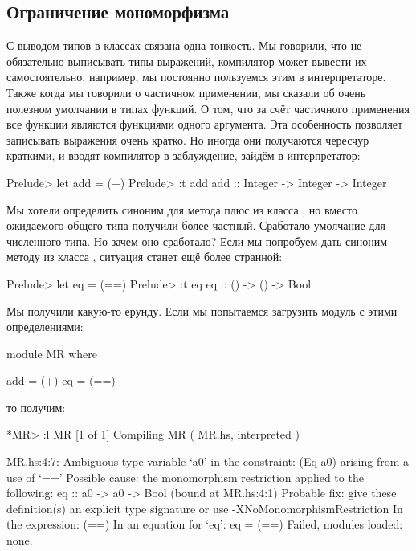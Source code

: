 \subsection{Ограничение мономорфизма}

С выводом типов в классах связана одна тонкость. 
Мы говорили, что не обязательно выписывать типы выражений,
компилятор может вывести их самостоятельно, например, 
мы постоянно пользуемся этим в интерпретаторе.
Также когда мы говорили о частичном применении,
мы сказали об очень полезном умолчании в типах функций.
О том, что за счёт частичного применения все функции 
являются функциями одного аргумента. Эта особенность
позволяет записывать выражения очень кратко. Но иногда
они получаются чересчур краткими, и вводят компилятор
в заблуждение, зайдём в интерпретатор:

\begin{code}
Prelude> let add = (+)
Prelude> :t add
add :: Integer -> Integer -> Integer
\end{code}

Мы хотели определить синоним для метода плюс из класса ,
но вместо ожидаемого общего типа получили более частный. 
Сработало умолчание для численного типа. Но зачем оно сработало?
Если мы попробуем дать синоним методу из класса ,
ситуация станет ещё более странной:

\begin{code}
Prelude> let eq = (==)
Prelude> :t eq
eq :: () -> () -> Bool
\end{code}

Мы получили какую-то ерунду. Если мы попытаемся загрузить 
модуль с этими определениями:

\begin{code}
module MR where

add = (+)
eq  = (==)
\end{code}

\noindent то получим:

\begin{code}
*MR> :l MR
[1 of 1] Compiling MR               ( MR.hs, interpreted )

MR.hs:4:7:
    Ambiguous type variable `a0' in the constraint:
      (Eq a0) arising from a use of `=='
    Possible cause: the monomorphism restriction applied to the following:
      eq :: a0 -> a0 -> Bool (bound at MR.hs:4:1)
    Probable fix: give these definition(s) an explicit type signature
                  or use -XNoMonomorphismRestriction
    In the expression: (==)
    In an equation for `eq': eq = (==)
Failed, modules loaded: none.
\end{code}

